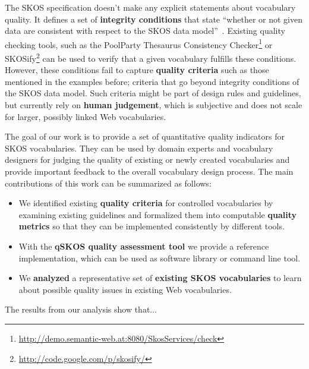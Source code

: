 
The SKOS specification doesn't make any explicit statements about vocabulary quality. It defines a set of \textbf{integrity conditions} that state ``whether or not given data are consistent with respect to the SKOS data model''~\cite{Miles2005}. Existing quality checking tools, such as the PoolParty Thesaurus Consistency Checker\footnote{\url{http://demo.semantic-web.at:8080/SkosServices/check}} or SKOSify\footnote{\url{http://code.google.com/p/skosify/}} can be used to verify that a given vocabulary fulfills these conditions. However, these conditions fail to capture \textbf{quality criteria} such as those mentioned in the examples before; criteria that go beyond integrity conditions of the SKOS data model. Such criteria might be part of design rules and guidelines, but currently rely on \textbf{human judgement}, which is subjective and does not scale for larger, possibly linked Web vocabularies.


The goal of our work is to provide a set of quantitative quality indicators for SKOS vocabularies. They can be used by domain experts and vocabulary designers for judging the quality of existing or newly created vocabularies and provide important feedback to the overall vocabulary design process. The main contributions of this work can be summarized as follows:

\begin{itemize}

	\item We identified existing \textbf{quality criteria} for controlled vocabularies by examining existing guidelines and formalized them into computable \textbf{quality metrics} so that they can be implemented consistently by different tools.
	
	\item With the \textbf{qSKOS quality assessment tool} we provide a reference implementation, which can be used as software library or command line tool.

	\item We \textbf{analyzed} a representative set of \textbf{existing SKOS vocabularies} to learn about possible quality issues in existing Web vocabularies.

\end{itemize}

The results from our analysis show that... 
